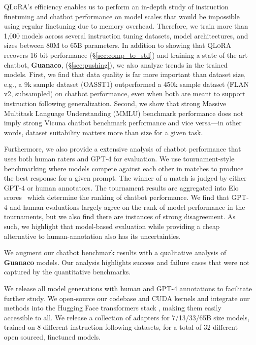 \textsc{QLoRA}'s efficiency enables us to perform an in-depth study of instruction finetuning and chatbot performance on model scales that would be impossible using regular finetuning due to memory overhead. Therefore, we train more than 1,000 models across several instruction tuning datasets, model architectures, and sizes between 80M to 65B parameters. In addition to showing that \textsc{QLoRA} recovers 16-bit performance (\S\ref{sec:comp_to_std}) and training a state-of-the-art chatbot, \textbf{Guanaco}, (\S\ref{sec:pushing}), we also analyze trends in the trained models. First, we find that data quality is far more important than dataset size, e.g., a 9k sample dataset (OASST1) outperformed a 450k sample dataset (FLAN v2, subsampled) on chatbot performance, even when both are meant to support instruction following generalization. Second, we show that strong Massive Multitask Language Understanding (MMLU) benchmark performance does not imply strong Vicuna chatbot benchmark performance and vice versa—in other words, dataset suitability matters more than size for a given task. 

Furthermore, we also provide a extensive analysis of chatbot performance that uses both human raters and GPT-4 for evaluation. We use tournament-style benchmarking where models compete against each other in matches to produce the best response for a given prompt. The winner of a match is judged by either GPT-4 or human annotators. The tournament results are aggregated into Elo scores~\citep{elo1967proposed, elo1978rating} which determine the ranking of chatbot performance. We find that GPT-4 and human evaluations largely agree on the rank of model performance in the tournaments, but we also find there are instances of strong disagreement. As such, we highlight that model-based evaluation while providing a cheap alternative to human-annotation also has its uncertainties. 

We augment our chatbot benchmark results with a qualitative analysis of \textbf{Guanaco} models. Our analysis highlights success and failure cases that were not captured by the quantitative benchmarks.

We release all model generations with human and GPT-4 annotations to facilitate further study. We open-source our codebase and CUDA kernels and integrate our methods into the Hugging Face transformers stack \citep{wolf2019huggingface}, making them easily accessible to all. We release a collection of adapters for 7/13/33/65B size models, trained on 8 different instruction following datasets, for a total of 32 different open sourced, finetuned models.

